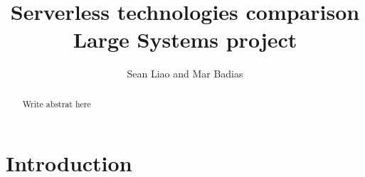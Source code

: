 \documentclass[11pt]{article}
\title{
  Serverless technologies comparison\\
  \large Large Systems project}
\author{Sean Liao and Mar Badias}
\begin{document}
\maketitle




\begin{abstract}
Write abstrat here
\end{abstract}

\newpage

\section{Introduction}
\label{introduction}

\end{document}
